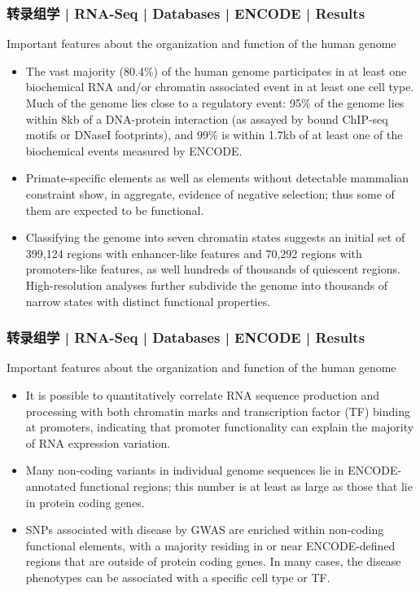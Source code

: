 \begin{frame}
  \frametitle{转录组学 | RNA-Seq | Databases | ENCODE | Results}
  {\footnotesize
  \begin{block}{Important features about the organization and function of the human genome}
  \begin{itemize}
    \item The vast majority (80.4\%) of the human genome participates in at least one biochemical RNA and/or chromatin associated event in at least one cell type. Much of the genome lies close to a regulatory event: 95\% of the genome lies within 8kb of a DNA-protein interaction (as assayed by bound ChIP-seq motifs or DNaseI footprints), and 99\% is within 1.7kb of at least one of the biochemical events measured by ENCODE.
    \item Primate-specific elements as well as elements without detectable mammalian constraint show, in aggregate, evidence of negative selection; thus some of them are expected to be functional.
    \item Classifying the genome into seven chromatin states suggests an initial set of 399,124 regions with enhancer-like features and 70,292 regions with promoters-like features, as well hundreds of thousands of quiescent regions. High-resolution analyses further subdivide the genome into thousands of narrow states with distinct functional properties.
  \end{itemize}
  \end{block}
  }
\end{frame}

\begin{frame}
  \frametitle{转录组学 | RNA-Seq | Databases | ENCODE | Results}
  \begin{block}{Important features about the organization and function of the human genome}
  \begin{itemize}
    \item It is possible to quantitatively correlate RNA sequence production and processing with both chromatin marks and transcription factor (TF) binding at promoters, indicating that promoter functionality can explain the majority of RNA expression variation.
    \item Many non-coding variants in individual genome sequences lie in ENCODE- annotated functional regions; this number is at least as large as those that lie in protein coding genes.
    \item SNPs associated with disease by GWAS are enriched within non-coding functional elements, with a majority residing in or near ENCODE-defined regions that are outside of protein coding genes. In many cases, the disease phenotypes can be associated with a specific cell type or TF.
  \end{itemize}
  \end{block}
\end{frame}


